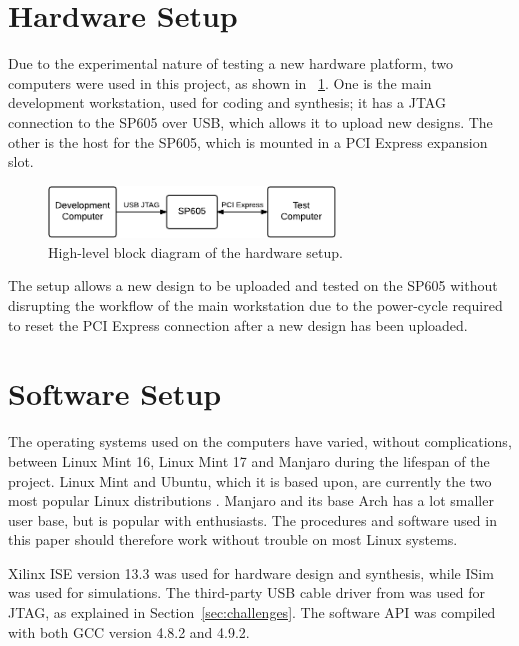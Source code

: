 \section{Hardware Setup}

Due to the experimental nature of testing a new hardware platform, two computers were used in this project, as shown in \figurename~\ref{fig:hardware-setup}.
One is the main development workstation, used for coding and synthesis; it has a JTAG connection to the SP605 over USB, which allows it to upload new designs.
The other is the host for the SP605, which is mounted in a PCI Express expansion slot.

\begin{figure}[!ht]
    \centering
    \includegraphics[width=0.68\textwidth]{figures/hardware-setup}
    \caption[Hardware setup]{
        High-level block diagram of the hardware setup.
    }
    \label{fig:hardware-setup}
\end{figure}

The setup allows a new design to be uploaded and tested on the SP605 without disrupting the workflow of the main workstation due to the power-cycle required to reset the PCI Express connection after a new design has been uploaded.

\section{Software Setup}

The operating systems used on the computers have varied, without complications, between Linux Mint 16, Linux Mint 17 and Manjaro during the lifespan of the project.
Linux Mint and Ubuntu, which it is based upon, are currently the two most popular Linux distributions \cite{distrowatch}.
Manjaro and its base Arch has a lot smaller user base, but is popular with enthusiasts.
The procedures and software used in this paper should therefore work without trouble on most Linux systems.

Xilinx ISE version 13.3 was used for hardware design and synthesis, while ISim was used for simulations.
The third-party USB cable driver from \cite{usbdriver} was used for JTAG, as explained in Section~\ref{sec:challenges}.
The software API was compiled with both GCC version 4.8.2 and 4.9.2.

